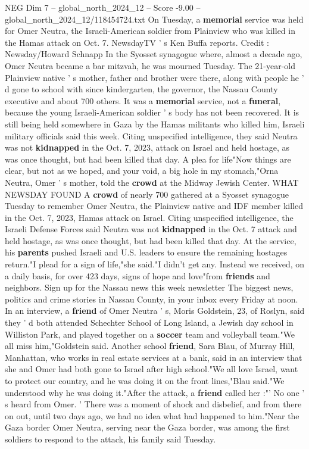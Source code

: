 \begin{textsample}{NEG Dim 7 – global\_north\_2024\_12 – Score -9.00 – global\_north\_2024\_12/118454724.txt}  \label{ex:f7_neg_158}
On Tuesday, a \textbf{memorial} service was held for Omer Neutra, the Israeli-American soldier from Plainview who was killed in the Hamas attack on Oct. 7.
NewsdayTV ' s Ken Buffa reports.
Credit : Newsday/Howard Schnapp In the Syosset synagogue where, almost a decade ago, Omer Neutra became a bar mitzvah, he was mourned Tuesday.
The 21-year-old Plainview native ' s mother, father and brother were there, along with people he ' d gone to school with since kindergarten, the governor, the Nassau County executive and about 700 others.
It was a \textbf{memorial} service, not a \textbf{funeral}, because the young Israeli-American soldier ' s body has not been recovered.
It is still being held somewhere in Gaza by the Hamas militants who killed him, Israeli military officials said this week.
Citing unspecified intelligence, they said Neutra was not \textbf{kidnapped} in the Oct. 7, 2023, attack on Israel and held hostage, as was once thought, but had been killed that day.
A plea for life"Now things are clear, but not as we hoped, and your void, a big hole in my stomach,"Orna Neutra, Omer ' s mother, told the \textbf{crowd} at the Midway Jewish Center.
WHAT NEWSDAY FOUND A \textbf{crowd} of nearly 700 gathered at a Syosset synagogue Tuesday to remember Omer Neutra, the Plainview native and IDF member killed in the Oct. 7, 2023, Hamas attack on Israel.
Citing unspecified intelligence, the Israeli Defense Forces said Neutra was not \textbf{kidnapped} in the Oct. 7 attack and held hostage, as was once thought, but had been killed that day.
At the service, his \textbf{parents} pushed Israeli and U.S. leaders to ensure the remaining hostages return."I plead for a sign of life,"she said."I didn't get any.
Instead we received, on a daily basis, for over 423 days, signs of hope and love"from \textbf{friends} and neighbors.
Sign up for the Nassau news this week newsletter The biggest news, politics and crime stories in Nassau County, in your inbox every Friday at noon.
In an interview, a \textbf{friend} of Omer Neutra ' s, Moris Goldstein, 23, of Roslyn, said they ' d both attended Schechter School of Long Island, a Jewish day school in Williston Park, and played together on a \textbf{soccer} team and volleyball team."We all miss him,"Goldstein said.
Another school \textbf{friend}, Sara Blau, of Murray Hill, Manhattan, who works in real estate services at a bank, said in an interview that she and Omer had both gone to Israel after high school."We all love Israel, want to protect our country, and he was doing it on the front lines,"Blau said."We understood why he was doing it."After the attack, a \textbf{friend} called her :"' No one ' s heard from Omer. ' There was a moment of shock and disbelief, and from there on out, until two days ago, we had no idea what had happened to him."Near the Gaza border Omer Neutra, serving near the Gaza border, was among the first soldiers to respond to the attack, his family said Tuesday.

\end{textsample}

